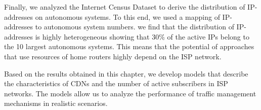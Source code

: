 Finally, we analyzed the Internet Census Dataset to derive the distribution of IP-addresses on autonomous systems.
To this end, we used a mapping of IP-addresses to autonomous system numbers.
we find that the distribution of IP-addresses is highly heterogeneous showing that 30\% of the active IPs belong to the 10 largest autonomous systems.
This means that the potential of approaches that use resources of home routers highly depend on the ISP network.

Based on the results obtained in this chapter, we develop models that describe the characteristics of CDNs and the number of active subscribers in ISP networks.
The models allow us to analyze the performance of traffic management mechanisms in realistic scenarios.

